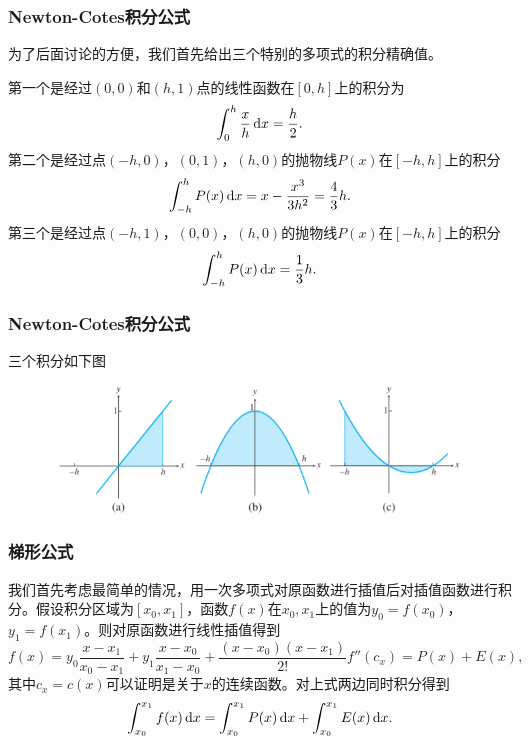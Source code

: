 \documentclass[10pt]{beamer}
\def\dx{\,{\rm d}x}
\begin{document}
\begin{frame}
\frametitle{Newton-Cotes积分公式}
为了后面讨论的方便，我们首先给出三个特别的多项式的积分精确值。

\vspace{0.2cm}

第一个是经过$(0,0)$和$(h,1)$点的线性函数在$[0,h]$上的积分为
\begin{equation}
\int_0^h \frac{x}{h} \dx = \frac{h}{2}.
\end{equation}
第二个是经过点$(-h,0)$，$(0,1)$，$(h,0)$的抛物线$P(x)$在$[-h, h]$上的积分
\begin{equation}
\label{eq: integral parabola 1}
\int_{-h}^h P(x) \dx = x - \frac{x^3}{3h^2} = \frac{4}{3}h.
\end{equation}
第三个是经过点$(-h,1)$，$(0,0)$，$(h,0)$的抛物线$P(x)$在$[-h, h]$上的积分
\begin{equation}
\label{eq: integral parabola 2}
\int_{-h}^h P(x) \dx  = \frac{1}{3}h.
\end{equation}
\end{frame}


\begin{frame}
\frametitle{Newton-Cotes积分公式}
三个积分如下图
\begin{figure}
\includegraphics[width=11cm]{figs/5-2-1_Newton-Cotes-1} 
\end{figure}
\end{frame}


\begin{frame}
\frametitle{梯形公式}
我们首先考虑最简单的情况，用一次多项式对原函数进行插值后对插值函数进行积分。假设积分区域为$[x_0, x_1]$，函数$f(x)$在$x_0, x_1$上的值为$y_0 = f(x_0)$，$y_1 = f(x_1)$。则对原函数进行线性插值得到
\begin{equation*}
f(x) = y_0 \frac{x - x_1}{x_0 - x_1} + y_1 \frac{x - x_0}{x_1 - x_0} + \frac{(x - x_0)(x - x_1)}{2!}f''(c_x) = P(x) + E(x), 
\end{equation*}
其中$c_x=c(x)$可以证明是关于$x$的连续函数。对上式两边同时积分得到
\begin{equation}
\label{eq: trapezoid rule original}
\int_{x_0}^{x_1} f(x) \dx = \int_{x_0}^{x_1} P(x) \dx + \int_{x_0}^{x_1} E(x) \dx.
\end{equation}
\end{frame}
\end{document}
